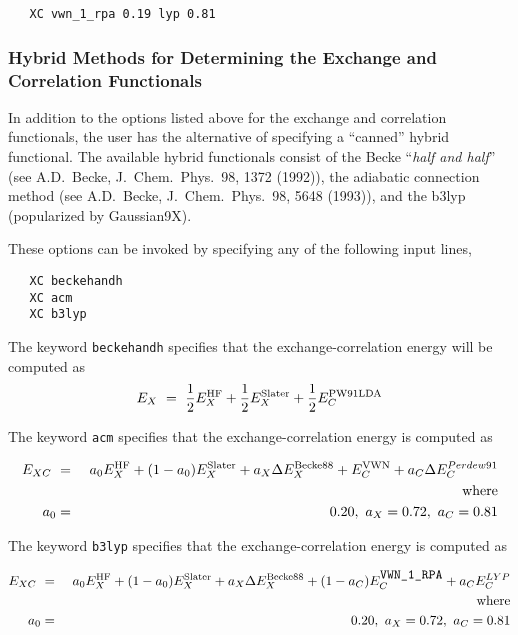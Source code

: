\begin{verbatim}
   XC vwn_1_rpa 0.19 lyp 0.81
\end{verbatim}

  

\subsubsection{Hybrid Methods for Determining the Exchange and Correlation 
Functionals}

In addition to the options listed above for the exchange and correlation
functionals, the user has the alternative of specifying a ``canned'' hybrid
functional.  The available hybrid functionals consist of the Becke
``{\sl half and half}'' (see A.D.~Becke, J.~Chem.~Phys.~98, 1372 (1992)), the
adiabatic connection method (see A.D.~Becke, J.~Chem.~Phys.~98, 5648
(1993)), and the b3lyp (popularized by Gaussian9X).

These options can be invoked by specifying any of the following input lines,

\begin{verbatim}
   XC beckehandh
   XC acm
   XC b3lyp
\end{verbatim}

The keyword \verb+beckehandh+ specifies that the exchange-correlation energy will be
computed as 
\begin{eqnarray*}
E_{X} \ = \ \frac{1}{2} E^{\rm HF}_X + \frac{1}{2} E^{\rm
  Slater}_{X} + \frac{1}{2} E^{\rm PW91LDA}_{C}
\end{eqnarray*}

The keyword \verb+acm+ specifies that the exchange-correlation energy
is computed as

\begin{eqnarray*}
E_{XC} \ &=& \ a_0 E^{\rm HF}_X + (1-a_0) E^{\rm Slater}_{X} +
a_X \Delta E^{\rm Becke88}_{X} + E^{\rm VWN}_C + a_C \Delta E^{Perdew91}_C \\
& &{\rm where } \\
a_0 &=& 0.20, \ a_X = 0.72, \ a_C = 0.81
\end{eqnarray*}

The keyword \verb+b3lyp+ specifies that the exchange-correlation energy
is computed as

\begin{eqnarray*}
E_{XC} \ &=& \ a_0 E^{\rm HF}_X + (1-a_0) E^{\rm Slater}_{X} +
a_X \Delta E^{\rm Becke88}_{X} + (1-a_C)E^{\rm \verb+VWN_1_RPA+}_C + a_C E^{LYP}_C \\
& &{\rm where } \\
a_0 &=& 0.20, \ a_X = 0.72, \ a_C = 0.81
\end{eqnarray*}


